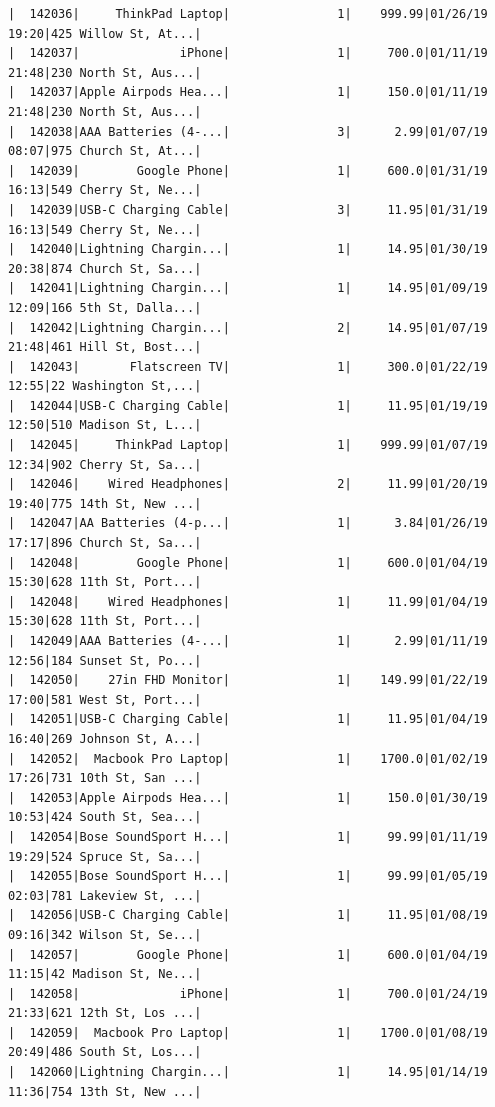 \documentclass[
  letterpaper,
  DIV=11,
  numbers=noendperiod]{scrartcl}
\begin{document}
\begin{verbatim}
|  142036|     ThinkPad Laptop|               1|    999.99|01/26/19 19:20|425 Willow St, At...|
|  142037|              iPhone|               1|     700.0|01/11/19 21:48|230 North St, Aus...|
|  142037|Apple Airpods Hea...|               1|     150.0|01/11/19 21:48|230 North St, Aus...|
|  142038|AAA Batteries (4-...|               3|      2.99|01/07/19 08:07|975 Church St, At...|
|  142039|        Google Phone|               1|     600.0|01/31/19 16:13|549 Cherry St, Ne...|
|  142039|USB-C Charging Cable|               3|     11.95|01/31/19 16:13|549 Cherry St, Ne...|
|  142040|Lightning Chargin...|               1|     14.95|01/30/19 20:38|874 Church St, Sa...|
|  142041|Lightning Chargin...|               1|     14.95|01/09/19 12:09|166 5th St, Dalla...|
|  142042|Lightning Chargin...|               2|     14.95|01/07/19 21:48|461 Hill St, Bost...|
|  142043|       Flatscreen TV|               1|     300.0|01/22/19 12:55|22 Washington St,...|
|  142044|USB-C Charging Cable|               1|     11.95|01/19/19 12:50|510 Madison St, L...|
|  142045|     ThinkPad Laptop|               1|    999.99|01/07/19 12:34|902 Cherry St, Sa...|
|  142046|    Wired Headphones|               2|     11.99|01/20/19 19:40|775 14th St, New ...|
|  142047|AA Batteries (4-p...|               1|      3.84|01/26/19 17:17|896 Church St, Sa...|
|  142048|        Google Phone|               1|     600.0|01/04/19 15:30|628 11th St, Port...|
|  142048|    Wired Headphones|               1|     11.99|01/04/19 15:30|628 11th St, Port...|
|  142049|AAA Batteries (4-...|               1|      2.99|01/11/19 12:56|184 Sunset St, Po...|
|  142050|    27in FHD Monitor|               1|    149.99|01/22/19 17:00|581 West St, Port...|
|  142051|USB-C Charging Cable|               1|     11.95|01/04/19 16:40|269 Johnson St, A...|
|  142052|  Macbook Pro Laptop|               1|    1700.0|01/02/19 17:26|731 10th St, San ...|
|  142053|Apple Airpods Hea...|               1|     150.0|01/30/19 10:53|424 South St, Sea...|
|  142054|Bose SoundSport H...|               1|     99.99|01/11/19 19:29|524 Spruce St, Sa...|
|  142055|Bose SoundSport H...|               1|     99.99|01/05/19 02:03|781 Lakeview St, ...|
|  142056|USB-C Charging Cable|               1|     11.95|01/08/19 09:16|342 Wilson St, Se...|
|  142057|        Google Phone|               1|     600.0|01/04/19 11:15|42 Madison St, Ne...|
|  142058|              iPhone|               1|     700.0|01/24/19 21:33|621 12th St, Los ...|
|  142059|  Macbook Pro Laptop|               1|    1700.0|01/08/19 20:49|486 South St, Los...|
|  142060|Lightning Chargin...|               1|     14.95|01/14/19 11:36|754 13th St, New ...|

\end{verbatim}
\end{document}

